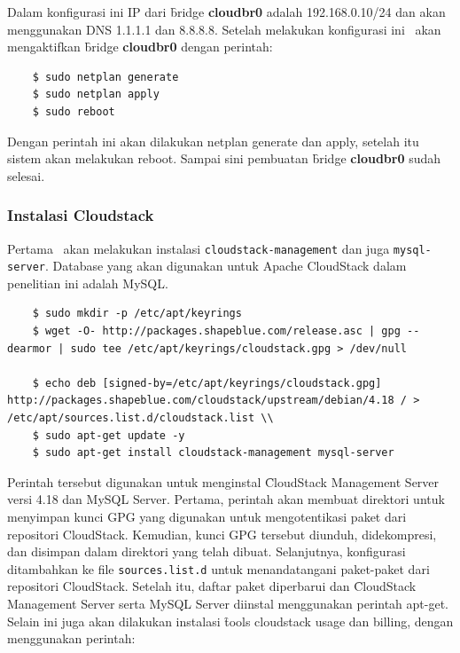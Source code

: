 Dalam konfigurasi ini IP dari \f{bridge} \textbf{cloudbr0} adalah 192.168.0.10/24 dan akan menggunakan DNS 1.1.1.1 dan 8.8.8.8. Setelah melakukan konfigurasi ini \saya\ akan mengaktifkan \f{bridge} \textbf{cloudbr0} dengan perintah:

\begin{listing}[H]
    \begin{verbatim}     
    $ sudo netplan generate
    $ sudo netplan apply
    $ sudo reboot
    \end{verbatim}
\end{listing}

Dengan perintah ini akan dilakukan netplan generate dan apply, setelah itu sistem akan melakukan reboot. Sampai sini pembuatan \f{bridge} \textbf{cloudbr0} sudah selesai.

\subsubsection{Instalasi Cloudstack}
Pertama \saya\ akan melakukan instalasi \texttt{cloudstack-management} dan juga \texttt{mysql-server}. Database yang akan digunakan untuk Apache CloudStack dalam penelitian ini adalah MySQL.

\begin{listing}[H]
    \begin{verbatim}    
    $ sudo mkdir -p /etc/apt/keyrings
    $ wget -O- http://packages.shapeblue.com/release.asc | gpg --dearmor | sudo tee /etc/apt/keyrings/cloudstack.gpg > /dev/null
    
    $ echo deb [signed-by=/etc/apt/keyrings/cloudstack.gpg] http://packages.shapeblue.com/cloudstack/upstream/debian/4.18 / > /etc/apt/sources.list.d/cloudstack.list \\
    $ sudo apt-get update -y
    $ sudo apt-get install cloudstack-management mysql-server
    \end{verbatim}
\end{listing}

Perintah tersebut digunakan untuk menginstal \f{CloudStack Management Server} versi 4.18 dan MySQL Server. Pertama, perintah akan membuat direktori untuk menyimpan kunci GPG yang digunakan untuk mengotentikasi paket dari repositori CloudStack. Kemudian, kunci GPG tersebut diunduh, didekompresi, dan disimpan dalam direktori yang telah dibuat. Selanjutnya, konfigurasi ditambahkan ke file \texttt{sources.list.d} untuk menandatangani paket-paket dari repositori CloudStack. Setelah itu, daftar paket diperbarui dan \f{CloudStack Management Server} serta MySQL Server diinstal menggunakan perintah apt-get. Selain ini juga akan dilakukan instalasi \f{tools} cloudstack usage dan billing, dengan menggunakan perintah:

